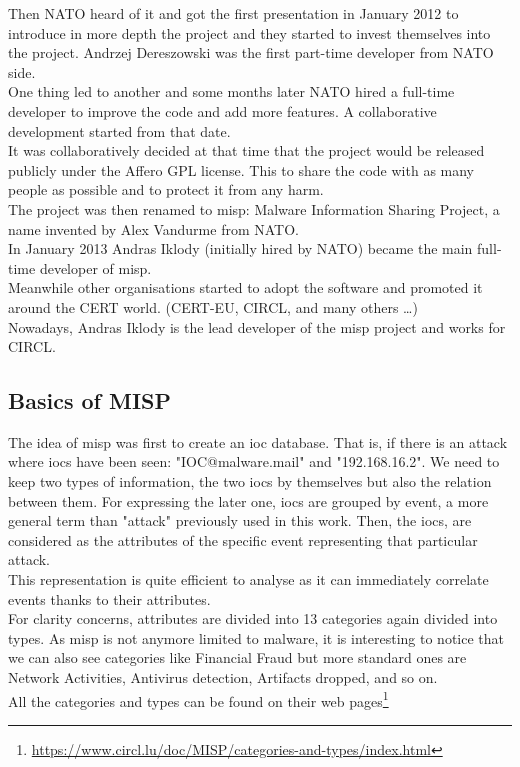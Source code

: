 \documentclass{eplmastersthesis}
\begin{document}
Then NATO heard of it and got the first presentation in January 2012 to introduce in more depth the project and they started to invest themselves into the project. Andrzej Dereszowski was the first part-time developer from NATO side.\\
One thing led to another and some months later NATO hired a full-time developer to improve the code and add more features. A collaborative development started from that date. \\
It was collaboratively decided at that time that the project would be released publicly under the Affero GPL license. This to share the code with as many people as possible and to protect it from any harm.\\
The project was then renamed to \gls{misp}: Malware Information Sharing Project, a name invented by Alex Vandurme from NATO.\\
In January 2013 Andras Iklody (initially hired by NATO) became the main full-time developer of \gls{misp}.\\

Meanwhile other organisations started to adopt the software and promoted it around the CERT world. (CERT-EU, CIRCL, and many others …)\\
Nowadays, Andras Iklody is the lead developer of the \gls{misp} project and works for CIRCL.\\

\subsection{Basics of MISP}
The idea of \gls{misp} was first to create an \gls{ioc} database. That is, if there is an attack where \gls{ioc}s have been seen: "IOC@malware.mail" and "192.168.16.2". We need to keep two types of information, the two \gls{ioc}s by themselves but also the relation between them. For expressing the later one, \gls{ioc}s are grouped by event, a more general term than "attack" previously used in this work.  Then, the \gls{ioc}s, are considered as the attributes of the specific event representing that particular attack.\\
This representation is quite efficient to analyse as it can immediately correlate events thanks to their attributes.\\

For clarity concerns, attributes are divided into 13 categories again divided into types. As \gls{misp} is not anymore limited to malware, it is interesting to notice that we can also see categories like Financial Fraud but more standard ones are Network Activities, Antivirus detection, Artifacts dropped, and so on.\\
All the categories and types can be found on their web pages\footnote {\url{https://www.circl.lu/doc/MISP/categories-and-types/index.html}}
\end{document}
